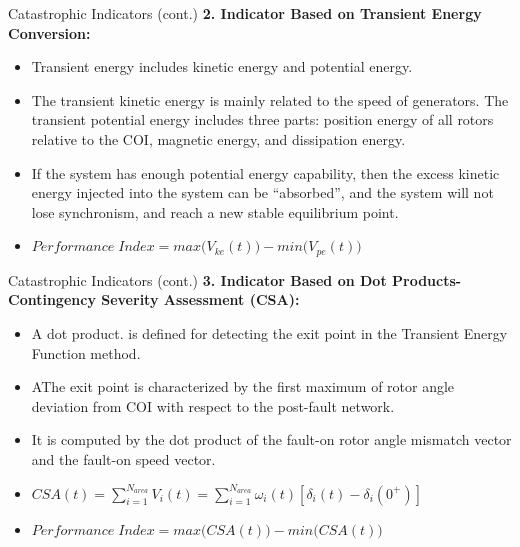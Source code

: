 \documentclass [xcolor=svgnames, t] {beamer}
\begin{document}
\begin{frame}{Catastrophic Indicators (cont.)}
\textbf{2. Indicator Based on Transient Energy Conversion:}
\begin{itemize}
\item Transient energy includes kinetic energy and potential energy.
\item The transient kinetic energy is mainly related to the speed of generators. The transient potential energy includes three parts: position energy of all rotors relative to the COI, magnetic energy, and dissipation energy.
\item If the system has enough potential energy capability, then the excess kinetic energy injected into the system can be “absorbed”, and the system will not lose synchronism, and reach a new stable equilibrium point.
\item $Performance \; Index = max\big(V_{ke}(t)\big) - min\big(V_{pe}(t)\big)$
\end{itemize}
\end{frame}

\begin{frame}{Catastrophic Indicators (cont.)}
\textbf{3. Indicator Based on Dot Products-  Contingency Severity Assessment (CSA):}
\begin{itemize}
\item A dot product. is defined for detecting the exit point in the Transient Energy Function method. 
\item AThe exit point is characterized by the first maximum of rotor angle deviation from COI with respect to the post-fault network. 
\item It is computed by the dot product of the fault-on rotor angle mismatch vector and the fault-on speed vector.
\item $CSA(t) = \sum_{i=1}^{N_{area}} V_i(t) = \sum_{i=1}^{N_{area}} \omega_i(t)[\delta_i(t) - \delta_i(0^+)]$
\item $Performance \; Index = max\big(CSA(t)\big) - min\big(CSA(t)\big)$
\end{itemize}
\end{frame}
\end{document}
